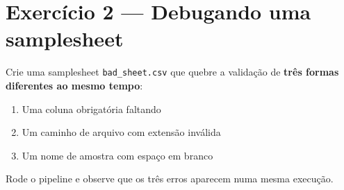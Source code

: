 \documentclass[
  brazilian,
  letterpaper,
  DIV=11,
  numbers=noendperiod]{scrreprt}
\providecommand{\tightlist}{%
  \setlength{\itemsep}{0pt}\setlength{\parskip}{0pt}}
\begin{document}
\section{Exercício 2 --- Debugando uma
samplesheet}\label{exercuxedcio-2-debugando-uma-samplesheet}

\begin{tcolorbox}[enhanced jigsaw, arc=.35mm, bottomrule=.15mm, bottomtitle=1mm, breakable, colback=white, colbacktitle=quarto-callout-note-color!10!white, colframe=quarto-callout-note-color-frame, coltitle=black, left=2mm, leftrule=.75mm, opacityback=0, opacitybacktitle=0.6, rightrule=.15mm, title=\textcolor{quarto-callout-note-color}{\faInfo}\hspace{0.5em}{Enunciado}, titlerule=0mm, toprule=.15mm, toptitle=1mm]

Crie uma samplesheet \texttt{bad\_sheet.csv} que quebre a validação de
\textbf{três formas diferentes ao mesmo tempo}:

\begin{enumerate}
\def\labelenumi{\arabic{enumi}.}
\tightlist
\item
  Uma coluna obrigatória faltando
\item
  Um caminho de arquivo com extensão inválida
\item
  Um nome de amostra com espaço em branco
\end{enumerate}

Rode o pipeline e observe que os três erros aparecem numa mesma
execução.

\end{tcolorbox}
\end{document}
